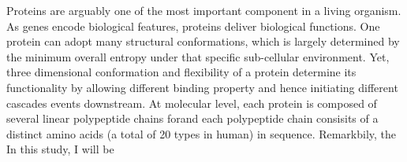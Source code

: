 Proteins are arguably one of the most important component in a living organism. As genes encode biological features, proteins deliver biological functions. One protein can adopt many structural conformations, which is largely determined by the minimum overall entropy under that specific sub-cellular environment. Yet, three dimensional conformation and flexibility of a protein determine its functionality by allowing different binding property and hence initiating different cascades events downstream. At molecular level, each protein is composed of several linear polypeptide chains forand each polypeptide chain consisits of a distinct amino acids (a total of 20 types in human) in sequence. Remarkbily, the  In this study, I will be 